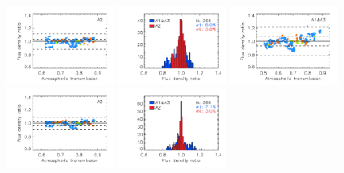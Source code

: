 \begin{figure}[ht!]
\begin{center}
    \includegraphics[clip=true, trim={0.9cm, 0.2cm, 0, 0.6cm}, width=0.32\textwidth]{Figures/Calibration/plot_flux_density_ratio_obstau_allbright_tau225_narrow_a2.pdf}
    \includegraphics[clip=true, trim={0.9cm, 0.2cm, 0, 0.6cm}, width=0.32\textwidth]{Figures/Calibration/plot_histo_flux_density_ratio_obstau_allbright_tau225_narrow_1n2mm.pdf}
    \includegraphics[clip=true, trim={0.9cm, 0.2cm, 0, 0.6cm}, width=0.32\textwidth]{Figures/Calibration/plot_flux_density_ratio_obstau_allbright_skydip_narrow_1mm.pdf}
    \includegraphics[clip=true, trim={0.9cm, 0.2cm, 0, 0.6cm}, width=0.32\textwidth]{Figures/Calibration/plot_flux_density_ratio_obstau_allbright_skydip_narrow_a2.pdf}
    \includegraphics[clip=true, trim={0.9cm, 0.2cm, 0, 0.6cm}, width=0.32\textwidth]{Figures/Calibration/plot_histo_flux_density_ratio_obstau_allbright_skydip_narrow_1n2mm.pdf}

\end{center}
\end{figure}

